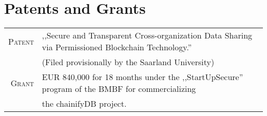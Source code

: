 \documentclass[a4paper,10pt]{article} %
\begin{document}
\begin{tabular}{rp{14.5cm}}
%
%
%
\end{tabular}


\section{Patents and Grants}
\vspace*{0.2cm}
\begin{tabular}{rp{16cm}}
	\textsc{Patent} & ,,Secure and Transparent Cross-organization Data Sharing via Permissioned Blockchain Technology.''\\
	& (Filed provisionally by the Saarland University)\\
	\textsc{Grant} & EUR 840,000 for 18 months under the ,,StartUpSecure'' program of the BMBF for commercializing \\
	&the chainifyDB project.
\end{tabular}

\end{document}
